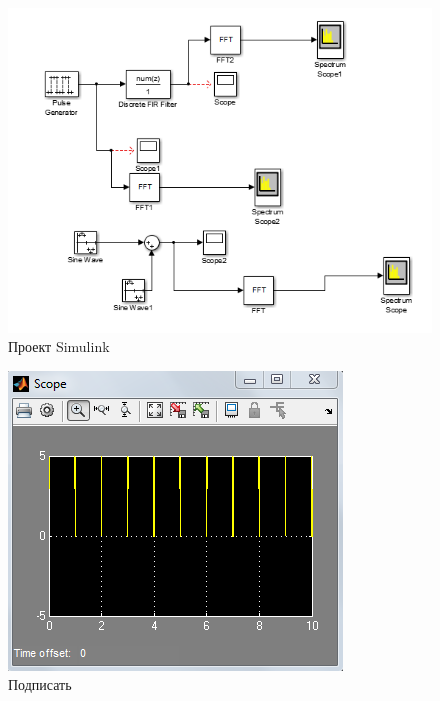 \documentclass[a4paper, 12pt]{article}
\begin{document}
\begin{figure}[H]
   \includegraphics[scale=0.7]{lab5/simulink.png}
   \caption{Проект Simulink}
\end{figure}

\begin{figure}[H]
   \includegraphics[scale=0.7]{lab5/scope.png}
   \caption{Подписать}
\end{figure}
\end{document}
